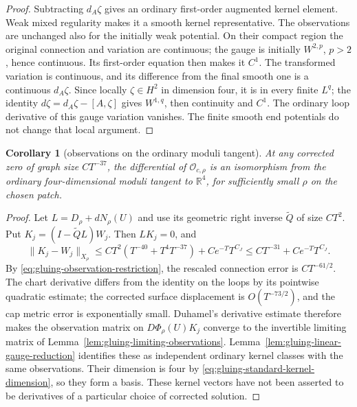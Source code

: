 \documentclass[11pt]{amsart}
\newtheorem{corollary}[theorem]{Corollary}
\theoremstyle{definition}
\theoremstyle{remark}
\theoremstyle{plain}
\begin{document}
\begin{proof}
Subtracting $d_A\zeta$ gives an ordinary first-order augmented
kernel element. Weak mixed regularity makes it a smooth kernel
representative. The observations are unchanged also for the initially
weak potential. On their compact region the original connection
and variation are continuous; the gauge is initially $W^{2,p}$,
$p>2$, hence continuous. Its first-order equation then makes it
$C^1$. The transformed variation is continuous, and its difference
from the final smooth one is a continuous $d_A\zeta$.
Since locally $\zeta\in H^2$ in dimension four, it is in
every finite $L^q$; the identity
$d\zeta=d_A\zeta-[A,\zeta]$ gives $W^{1,q}$, then
continuity and $C^1$. The ordinary loop derivative of this gauge
variation vanishes. The finite smooth end potentials do not change
that local argument.
\end{proof}

\begin{corollary}[observations on the ordinary moduli tangent]
\label{cor:gluing-observation-coordinates}
At any corrected zero of graph size $CT^{-37}$, the differential
of $\mathcal O_{c,\rho}$ is an isomorphism from the ordinary
four-dimensional moduli tangent to $\mathbb R^4$, for sufficiently
small $\rho$ on the chosen patch.
\end{corollary}

\begin{proof}
Let $L=D_\rho+dN_\rho(U)$ and use its geometric right inverse
$\widetilde Q$ of size $CT^2$. Put
$K_j=(I-\widetilde QL)W_j$. Then $LK_j=0$, and
\[
 \|K_j-W_j\|_{X_\rho}
      \leq CT^2(T^{-40}+T^4T^{-37})+Ce^{-T}T^{C_J}
                                           \leq CT^{-31}+Ce^{-T}T^{C_J}.
\]
By \eqref{eq:gluing-observation-restriction}, the rescaled
connection error is $CT^{-61/2}$. The chart derivative differs
from the identity on the loops by its pointwise quadratic estimate;
the corrected surface displacement is $O(T^{-73/2})$, and the
cap metric error is exponentially small. Duhamel's derivative
estimate therefore makes the observation matrix on
$D\Phi_\rho(U)K_j$ converge to the invertible limiting matrix
of Lemma~\ref{lem:gluing-limiting-observations}.
Lemma~\ref{lem:gluing-linear-gauge-reduction} identifies these as
independent ordinary kernel classes with the same observations.
Their dimension is four by
\eqref{eq:gluing-standard-kernel-dimension}, so they form a basis.
These kernel vectors have not been asserted to be derivatives of
a particular choice of corrected solution.
\end{proof}
\end{document}
